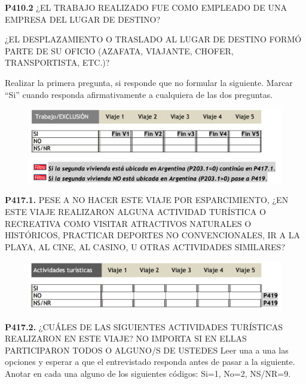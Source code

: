 \documentclass[
  openany]{book}
\begin{document}
\textbf{P410.2} ¿EL TRABAJO REALIZADO FUE COMO EMPLEADO DE UNA EMPRESA DEL LUGAR DE DESTINO?

¿EL DESPLAZAMIENTO O TRASLADO AL LUGAR DE DESTINO FORMÓ PARTE DE SU OFICIO (AZAFATA, VIAJANTE, CHOFER, TRANSPORTISTA, ETC.)?

Realizar la primera pregunta, si responde que no formular la siguiente. Marcar ``Si'' cuando responda afirmativamente a cualquiera de las dos preguntas.

\begin{figure}

{\centering \includegraphics[width=1\linewidth]{imagenes/figura6-183} 

}

\end{figure}

\textbf{P417.1.} PESE A NO HACER ESTE VIAJE POR ESPARCIMIENTO, ¿EN ESTE VIAJE REALIZARON ALGUNA ACTIVIDAD TURÍSTICA O RECREATIVA COMO VISITAR ATRACTIVOS NATURALES O HISTÓRICOS, PRACTICAR DEPORTES NO CONVENCIONALES, IR A LA PLAYA, AL CINE, AL CASINO, U OTRAS ACTIVIDADES SIMILARES?

\begin{figure}

{\centering \includegraphics[width=1\linewidth]{imagenes/figura6-184} 

}

\end{figure}

\textbf{P417.2.} ¿CUÁLES DE LAS SIGUIENTES ACTIVIDADES TURÍSTICAS REALIZARON EN ESTE VIAJE? NO IMPORTA SI EN ELLAS PARTICIPARON TODOS O ALGUNO/S DE USTEDES
Leer una a una las opciones y esperar a que el entrevistado responda antes de pasar a la siguiente. Anotar en cada una alguno de los siguientes códigos: Si=1, No=2, NS/NR=9.
\end{document}
